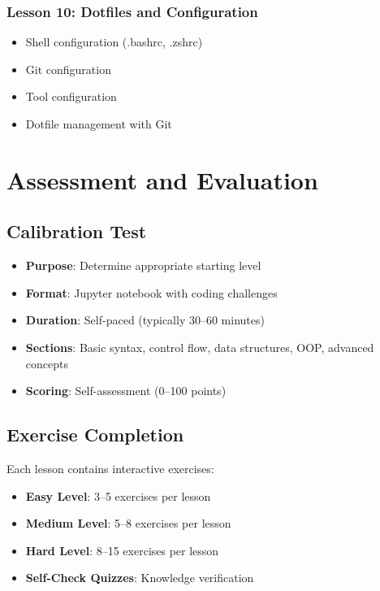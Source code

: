 \documentclass[11pt,letterpaper]{article}
\begin{document}
\subsubsection{Lesson 10: Dotfiles and Configuration}
\begin{itemize}[leftmargin=*]
    \item Shell configuration (.bashrc, .zshrc)
    \item Git configuration
    \item Tool configuration
    \item Dotfile management with Git
\end{itemize}

\section{Assessment and Evaluation}

\subsection{Calibration Test}
\begin{itemize}[leftmargin=*]
    \item \textbf{Purpose}: Determine appropriate starting level
    \item \textbf{Format}: Jupyter notebook with coding challenges
    \item \textbf{Duration}: Self-paced (typically 30--60 minutes)
    \item \textbf{Sections}: Basic syntax, control flow, data structures, OOP, advanced concepts
    \item \textbf{Scoring}: Self-assessment (0--100 points)
\end{itemize}

\subsection{Exercise Completion}
Each lesson contains interactive exercises:
\begin{itemize}[leftmargin=*]
    \item \textbf{Easy Level}: 3--5 exercises per lesson
    \item \textbf{Medium Level}: 5--8 exercises per lesson
    \item \textbf{Hard Level}: 8--15 exercises per lesson
    \item \textbf{Self-Check Quizzes}: Knowledge verification
\end{itemize}
\end{document}

